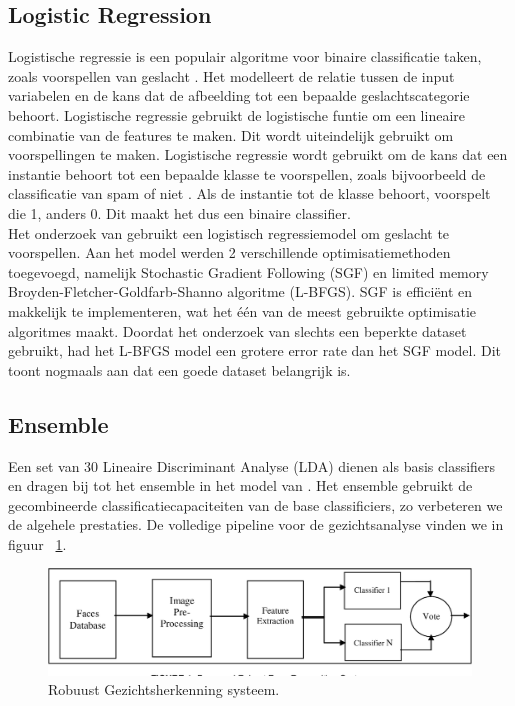 \subsection{Logistic Regression}\label{sub:logregression}
Logistische regressie is een populair algoritme voor binaire classificatie taken, zoals voorspellen van geslacht \autocite{Ramon2024}. Het modelleert de relatie tussen de input variabelen en de kans dat de afbeelding tot een bepaalde geslachtscategorie behoort. Logistische regressie gebruikt de logistische funtie om een lineaire combinatie van de features te maken. Dit wordt uiteindelijk gebruikt om voorspellingen te maken. Logistische regressie wordt gebruikt om de kans dat een instantie behoort tot een bepaalde klasse te voorspellen, zoals bijvoorbeeld de classificatie van spam of niet \autocite{Geron2019}. Als de instantie tot de klasse behoort, voorspelt die 1, anders 0. Dit maakt het dus een binaire classifier. 
\\
Het onderzoek van \textcite{Yavuz2014} gebruikt een logistisch regressiemodel om geslacht te voorspellen. Aan het model werden 2 verschillende optimisatiemethoden toegevoegd, namelijk Stochastic Gradient Following (SGF) en limited memory Broyden-Fletcher-Goldfarb-Shanno algoritme (L-BFGS). SGF is efficiënt en makkelijk te implementeren, wat het één van de meest gebruikte optimisatie algoritmes maakt. Doordat het onderzoek van \textcite{Yavuz2014} slechts een beperkte dataset gebruikt, had het L-BFGS model een grotere error rate dan het SGF model. Dit toont nogmaals aan dat een goede dataset belangrijk is. 

\subsection{Ensemble}
\label{sub:ensemble}
Een set van 30 Lineaire Discriminant Analyse (LDA) dienen als basis classifiers en dragen bij tot het ensemble in het model van \textcite{Khan2017}. Het ensemble gebruikt de gecombineerde classificatiecapaciteiten van de base classificiers, zo verbeteren we de algehele prestaties. De volledige pipeline voor de gezichtsanalyse vinden we in figuur {~\ref{fig:ensemble}}. 
\begin{figure}
    \centering
    \includegraphics[width=\columnwidth]{graphics/ensemble.png}
    \caption[Robuust gezichtsherkenning systeem]{Robuust Gezichtsherkenning systeem\autocite{Khan2017}.
        \label{fig:ensemble}}
\end{figure}

